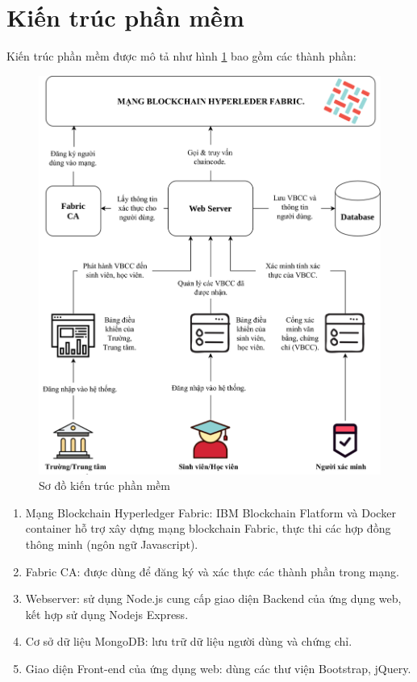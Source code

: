 \section{Kiến trúc phần mềm}
Kiến trúc phần mềm được mô tả như hình \ref{fig:vbcc_phanmem} bao gồm các thành phần:
\begin{figure}[htbp]
\centering
\includegraphics[width=.9\linewidth]{img/vbcc_phanmem.jpg}
\caption{Sơ đồ kiến trúc phần mềm}
\label{fig:vbcc_phanmem}
\end{figure}
\begin{enumerate}
\item Mạng Blockchain Hyperledger Fabric: IBM Blockchain Flatform và Docker container hỗ trợ xây dựng mạng blockchain Fabric, thực thi các hợp đồng thông minh (ngôn ngữ Javascript).
\item Fabric CA: được dùng để đăng ký và xác thực các thành phần trong mạng.
\item Webserver: sử dụng Node.js cung cấp giao diện Backend của ứng dụng web, kết hợp sử dụng Nodejs Express.
\item Cơ sở dữ liệu MongoDB: lưu trữ dữ liệu người dùng và chứng chỉ.
\item Giao diện Front-end của ứng dụng web: dùng các thư viện Bootstrap, jQuery.
\end{enumerate}

